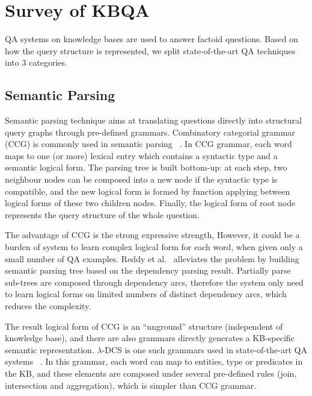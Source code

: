 \section{Survey of KBQA}

QA systems on knowledge bases are used to answer factoid questions.
Based on how the query structure is represented, we split state-of-the-art QA techniques into 3 categories.

\subsection{Semantic Parsing}

Semantic parsing technique aims at translating questions directly into structural
query graphs through pre-defined grammars.
Combinatory categorial grammar (CCG) is commonly used in semantic parsing~
\cite{kwiatkowski2013scaling,cai2013large}.
In CCG grammar, each word maps to one (or more) lexical entry which contains a syntactic type and a semantic logical form.
The parsing tree is built bottom-up: at each step, two neighbour nodes can be composed into a
new node if the syntactic type is compatible, and the new logical form is formed by function applying between logical forms of these two children nodes.
Finally, the logical form of root node represents the query structure of the whole question.

The advantage of CCG is the strong expressive strength,
However, it could be a burden of system to learn complex logical form for each word,
when given only a small number of QA examples.
Reddy et al.~ alleviates the problem by
building semantic parsing tree based on the dependency parsing result.
Partially parse sub-trees are composed through dependency arcs, therefore the system only need to learn logical forms on limited numbers of distinct dependency arcs,
which reduces the complexity.

The result logical form of CCG is an ``unground'' structure (independent of knowledge base),
and there are also grammars directly generates a KB-specific semantic representation.
$\lambda$-DCS is one such grammars used in state-of-the-art QA systems~
\cite{berant2013semantic,berant2014semantic,berant2015imitation}.
In this grammar, each word can map to entities, type or predicates in the KB, and these elements are composed
under several pre-defined rules (join, intersection and aggregation), which is simpler than CCG grammar.


